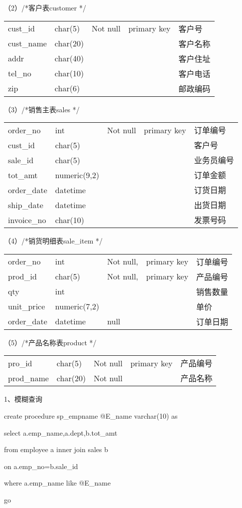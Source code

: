 \documentclass[
]{article}
\begin{document}
（2）/*客户表customer */

\begin{longtable}[]{@{}lllll@{}}
\toprule
\endhead
cust\_id & char(5) & Not null & primary key & 客户号\tabularnewline
cust\_name & char(20) & & & 客户名称\tabularnewline
addr & char(40) & & & 客户住址\tabularnewline
tel\_no & char(10) & & & 客户电话\tabularnewline
zip & char(6) & & & 邮政编码\tabularnewline
\bottomrule
\end{longtable}

（3）/*销售主表sales */

\begin{longtable}[]{@{}lllll@{}}
\toprule
\endhead
order\_no & int & Not null & primary key & 订单编号\tabularnewline
cust\_id & char(5) & & & 客户号\tabularnewline
sale\_id & char(5) & & & 业务员编号\tabularnewline
tot\_amt & numeric(9,2) & & & 订单金额\tabularnewline
order\_date & datetime & & & 订货日期\tabularnewline
ship\_date & datetime & & & 出货日期\tabularnewline
invoice\_no & char(10) & & & 发票号码\tabularnewline
\bottomrule
\end{longtable}

（4）/*销货明细表sale\_item */

\begin{longtable}[]{@{}lllll@{}}
\toprule
\endhead
order\_no & int & Not null, & primary key & 订单编号\tabularnewline
prod\_id & char(5) & Not null, & primary key & 产品编号\tabularnewline
qty & int & & & 销售数量\tabularnewline
unit\_price & numeric(7,2) & & & 单价\tabularnewline
order\_date & datetime & null & & 订单日期\tabularnewline
\bottomrule
\end{longtable}

（5）/*产品名称表product */

\begin{longtable}[]{@{}lllll@{}}
\toprule
\endhead
pro\_id & char(5) & Not null & primary key & 产品编号\tabularnewline
prod\_name & char(20) & Not null & & 产品名称\tabularnewline
\bottomrule
\end{longtable}

1、模糊查询

create procedure sp\_empname @E\_name varchar(10) as

select a.emp\_name,a.dept,b.tot\_amt

from employee a inner join sales b

on a.emp\_no=b.sale\_id

where a.emp\_name like @E\_name

go
\end{document}
